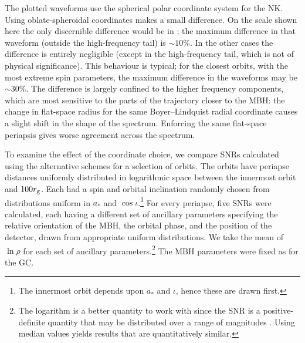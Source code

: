The plotted waveforms use the spherical polar coordinate system for the NK. Using oblate-spheroidal coordinates makes a small difference. On the scale shown here the only discernible difference would be in ; the maximum difference in that waveform (outside the high-frequency tail) is $\sim 10\%$. In the other cases the difference is entirely negligible (except in the high-frequency tail, which is not of physical significance). This behaviour is typical; for the closest orbits, with the most extreme spin parameters, the maximum difference in the waveforms may be $\sim 30\%$. The difference is largely confined to the higher frequency components, which are most sensitive to the parts of the trajectory closer to the MBH: the change in flat-space radius for the same Boyer--Lindquist radial coordinate causes a slight shift in the shape of the spectrum. Enforcing the same flat-space periapsis gives worse agreement across the spectrum.

To examine the effect of the coordinate choice, we compare SNRs calculated using the alternative schemes for a selection of orbits. The orbits have periapse distances uniformly distributed in logarithmic space between the innermost orbit and $100 r_\mathrm{g}$. Each had a spin and orbital inclination randomly chosen from distributions uniform in $a_\ast$ and $\cos \iota$.\footnote{The innermost orbit depends upon $a_\ast$ and $\iota$, hence these are drawn first.} For every periapse, five SNRs were calculated, each having a different set of ancillary parameters specifying the relative orientation of the MBH, the orbital phase, and the position of the detector, drawn from appropriate uniform distributions. We take the mean of $\ln \rho$ for each set of ancillary parameters.\footnote{The logarithm is a better quantity to work with since the SNR is a positive-definite quantity that may be distributed over a range of magnitudes \citep[sections 22.1, 23.3]{MacKay2003}. Using median values yields results that are quantitatively similar.} The MBH parameters were fixed as for the GC.

